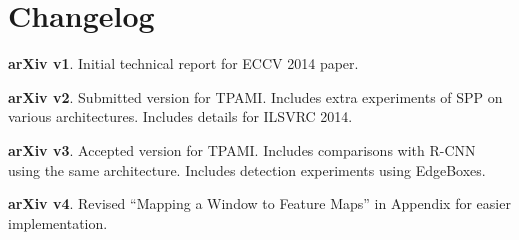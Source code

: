 \documentclass[10pt,journal,cspaper,compsoc]{IEEEtran}
\begin{document}



\section*{Changelog}

\noindent\textbf{arXiv v1}. Initial technical report for ECCV 2014 paper.

\vspace{6pt}
\noindent\textbf{arXiv v2}. Submitted version for TPAMI. Includes extra experiments of SPP on various architectures. Includes details for ILSVRC 2014.

\vspace{6pt}
\noindent\textbf{arXiv v3}. Accepted version for TPAMI. Includes comparisons with R-CNN using the same architecture. Includes detection experiments using EdgeBoxes.

\vspace{6pt}
\noindent\textbf{arXiv v4}. Revised ``Mapping a Window to Feature Maps'' in Appendix for easier implementation.

\vfill
\end{document}
